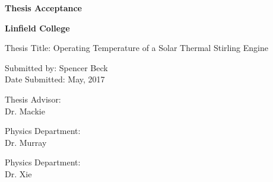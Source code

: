     \begin{center}
    
    \textbf{Thesis Acceptance}
    \vspace{0.5in}
    
    \textbf{Linfield College}
    \doublespacing
    \vspace{1.0in}

    \end{center}

    Thesis Title:\tabto{4.5cm} Operating Temperature of a Solar Thermal Stirling Engine
    \vspace{0.5in}
    
    Submitted by:\tabto{4.5cm} Spencer Beck
    \\
    \indent Date Submitted:\tabto{4.5cm} May, 2017

    \vspace{1.0in}

    Thesis Advisor:   \hrulefill\quad\\
    \hspace*{148pt} Dr. Mackie
    \vspace{0.5in}
    
    Physics Department:  \hrulefill\quad\\
    \hspace*{148pt} Dr. Murray
    \vspace{0.5in}
    
    Physics Department:  \hrulefill\quad\\
    \hspace*{148pt} Dr. Xie